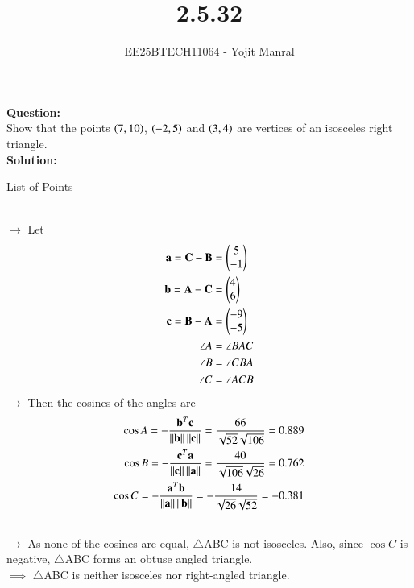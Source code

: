\documentclass[journal]{IEEEtran}
\begin{document}

\vspace{3cm}

\title{2.5.32}
\author{EE25BTECH11064 - Yojit Manral}

\maketitle
{\let\newpage\relax\maketitle}
\renewcommand{\thefigure}{\theenumi}
\renewcommand{\thetable}{\theenumi}
\setlength{\intextsep}{10pt} %

\textbf{Question:}\\
Show that the points $\left(7,10\right)$, $\left(-2,5\right)$ and $\left(3,4\right)$ are vertices of an isosceles right triangle.\\

\textbf{Solution:}\\
\begin{table}[h!]    
  \centering
  
  \caption{List of Points}
  \label{Table_1}
\end{table} \\
$\rightarrow$ Let
\begin{align}
    \mathbf{a} = \mathbf{C} - \mathbf{B} &= \begin{pmatrix}5\\-1\end{pmatrix}\\
    \mathbf{b} = \mathbf{A} - \mathbf{C} &= \begin{pmatrix}4\\6\end{pmatrix}\\
    \mathbf{c} = \mathbf{B} - \mathbf{A} &= \begin{pmatrix}-9\\-5\end{pmatrix}\\
    \angle{A} &= \angle{BAC}\\
    \angle{B} &= \angle{CBA}\\
    \angle{C} &= \angle{ACB}
\end{align}
$\rightarrow$ Then the cosines of the angles are
\begin{align}
    \cos{A} = -\frac{\mathbf{b}^{T}\mathbf{c}}{\left\lVert\mathbf{b}\right\rVert\left\lVert\mathbf{c}\right\rVert} = \frac{66}{\sqrt{52}\sqrt{106}} = 0.889\\
    \cos{B} = -\frac{\mathbf{c}^{T}\mathbf{a}}{\left\lVert\mathbf{c}\right\rVert\left\lVert\mathbf{a}\right\rVert} = \frac{40}{\sqrt{106}\sqrt{26}} = 0.762\\
    \cos{C} = -\frac{\mathbf{a}^{T}\mathbf{b}}{\left\lVert\mathbf{a}\right\rVert\left\lVert\mathbf{b}\right\rVert} = -\frac{14}{\sqrt{26}\sqrt{52}} = -0.381 \\
    \notag
\end{align}
$\rightarrow$ As none of the cosines are equal, $\triangle$ABC is not isosceles. Also, since $\cos{C}$ is negative, $\triangle$ABC forms an obtuse angled triangle. \\
$\implies$ $\triangle$ABC is neither isosceles nor right-angled triangle.
\end{document}
